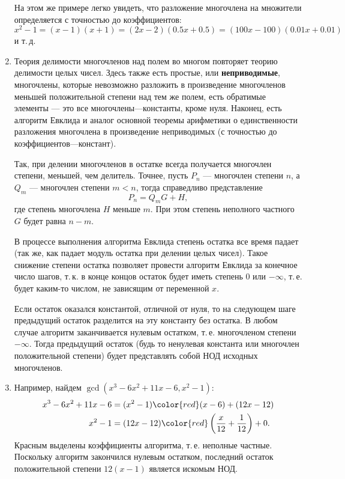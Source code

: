 \begin{enumerate}
На этом же примере легко увидеть, что разложение многочлена на множители определяется с точностью до коэффициентов:
$$
x^2-1=(x-1)(x+1)=(2x-2)(0.5x+0.5)=(100x-100)(0.01x+0.01)
$$
и т.\,д.

\item Теория делимости многочленов над полем во многом повторяет теорию делимости целых чисел. Здесь также есть простые, или \textbf{неприводимые}, многочлены, которые невозможно разложить в произведение многочленов меньшей положительной степени над тем же полем, есть обратимые элементы --- это все многочлены---константы, кроме нуля. Наконец, есть алгоритм Евклида и аналог основной теоремы арифметики о единственности разложения многочлена в произведение неприводимых (с точностью до коэффициентов---констант).

Так, при делении многочленов в остатке всегда получается многочлен степени, меньшей, чем делитель. Точнее, пусть $P_n$ --- многочлен степени $n$, а $Q_m$ --- многочлен степени $m<n$, тогда справедливо представление
$$
P_n = Q_m G+H,
$$
где степень многочлена $H$ меньше $m$. При этом степень неполного частного $G$ будет равна $n-m$.

В процессе выполнения алгоритма Евклида степень остатка все время падает (так же, как падает модуль остатка при делении целых чисел).
Такое снижение степени остатка позволяет провести алгоритм Евклида за конечное число шагов, т.\,к. в конце концов остаток будет иметь степень 0 или $-\infty$, т.\,е. будет каким-то числом, не зависящим от переменной $x$.

Если остаток оказался константой, отличной от нуля, то на следующем шаге предыдущий остаток разделится на эту константу без остатка. В любом случае алгоритм заканчивается нулевым остатком, т.\,е. многочленом степени $-\infty$. Тогда предыдущий остаток (будь то ненулевая константа или многочлен положительной степени) будет представлять собой НОД исходных многочленов.

\item
Например, найдем $\gcd(x^3-6x^2+11x-6,x^2-1)$:
\begin{align*}
x^3-6x^2+11x-6 & = (x^2-1){\color{red}(x-6)} + (12x-12) \\
x^2-1 & = (12x-12){\color{red}\left(\frac{x}{12}+\frac{1}{12}\right)} + 0.
\end{align*}
Красным выделены коэффициенты алгоритма, т.\,е. неполные частные. Поскольку алгоритм закончился нулевым остатком, последний остаток положительной степени $12(x-1)$ является искомым НОД.


\end{enumerate}
